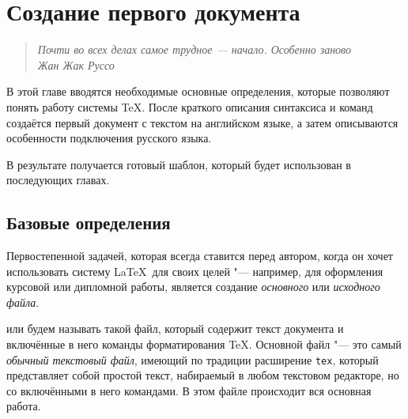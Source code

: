 ﻿%
	\chapter{Создание первого документа}\label{CH:MainFile}


\begin{quote}\em
Почти во всех делах самое трудное --- начало. Особенно заново\\[.3cm]
\mbox{}\hspace{\fill}\rm Жан Жак Руссо
\end{quote}


В этой главе вводятся необходимые основные определения, которые позволяют понять работу системы \TeX. После краткого описания синтаксиса и команд создаётся первый документ с текстом на английском языке, а затем описываются особенности подключения русского языка.

В результате получается готовый шаблон, который будет использован в последующих главах.




\section{Базовые определения}\label{Sec:MainFile-Definitions}

Первостепенной задачей, которая всегда ставится перед автором, когда он хочет использовать систему \LaTeX\ для своих целей "--- например, для оформления курсовой или дипломной работы, является создание \emph{основного} или \emph{исходного файла}.

 или  будем называть такой файл, который содержит текст документа и включённые в него команды форматирования \TeX. Основной файл "--- это самый \emph{обычный текстовый файл}, имеющий по традиции расширение \verb|tex|, который представляет собой простой текст, набираемый в любом текстовом редакторе, но со включёнными в него командами. В этом файле происходит вся основная работа.

